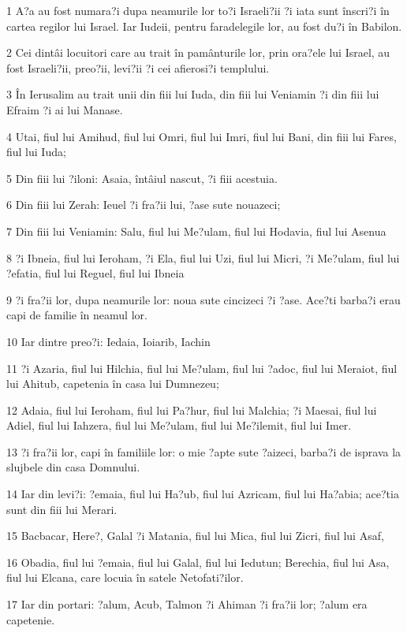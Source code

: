 \par 1 A?a au fost numara?i dupa neamurile lor to?i Israeli?ii ?i iata sunt înscri?i în cartea regilor lui Israel. Iar Iudeii, pentru faradelegile lor, au fost du?i în Babilon.
\par 2 Cei dintâi locuitori care au trait în pamânturile lor, prin ora?ele lui Israel, au fost Israeli?ii, preo?ii, levi?ii ?i cei afierosi?i templului.
\par 3 În Ierusalim au trait unii din fiii lui Iuda, din fiii lui Veniamin ?i din fiii lui Efraim ?i ai lui Manase.
\par 4 Utai, fiul lui Amihud, fiul lui Omri, fiul lui Imri, fiul lui Bani, din fiii lui Fares, fiul lui Iuda;
\par 5 Din fiii lui ?iloni: Asaia, întâiul nascut, ?i fiii acestuia.
\par 6 Din fiii lui Zerah: Ieuel ?i fra?ii lui, ?ase sute nouazeci;
\par 7 Din fiii lui Veniamin: Salu, fiul lui Me?ulam, fiul lui Hodavia, fiul lui Asenua
\par 8 ?i Ibneia, fiul lui Ieroham, ?i Ela, fiul lui Uzi, fiul lui Micri, ?i Me?ulam, fiul lui ?efatia, fiul lui Reguel, fiul lui Ibneia
\par 9 ?i fra?ii lor, dupa neamurile lor: noua sute cincizeci ?i ?ase. Ace?ti barba?i erau capi de familie în neamul lor.
\par 10 Iar dintre preo?i: Iedaia, Ioiarib, Iachin
\par 11 ?i Azaria, fiul lui Hilchia, fiul lui Me?ulam, fiul lui ?adoc, fiul lui Meraiot, fiul lui Ahitub, capetenia în casa lui Dumnezeu;
\par 12 Adaia, fiul lui Ieroham, fiul lui Pa?hur, fiul lui Malchia; ?i Maesai, fiul lui Adiel, fiul lui Iahzera, fiul lui Me?ulam, fiul lui Me?ilemit, fiul lui Imer.
\par 13 ?i fra?ii lor, capi în familiile lor: o mie ?apte sute ?aizeci, barba?i de isprava la slujbele din casa Domnului.
\par 14 Iar din levi?i: ?emaia, fiul lui Ha?ub, fiul lui Azricam, fiul lui Ha?abia; ace?tia sunt din fiii lui Merari.
\par 15 Bacbacar, Here?, Galal ?i Matania, fiul lui Mica, fiul lui Zicri, fiul lui Asaf,
\par 16 Obadia, fiul lui ?emaia, fiul lui Galal, fiul lui Iedutun; Berechia, fiul lui Asa, fiul lui Elcana, care locuia în satele Netofati?ilor.
\par 17 Iar din portari: ?alum, Acub, Talmon ?i Ahiman ?i fra?ii lor; ?alum era capetenie.
